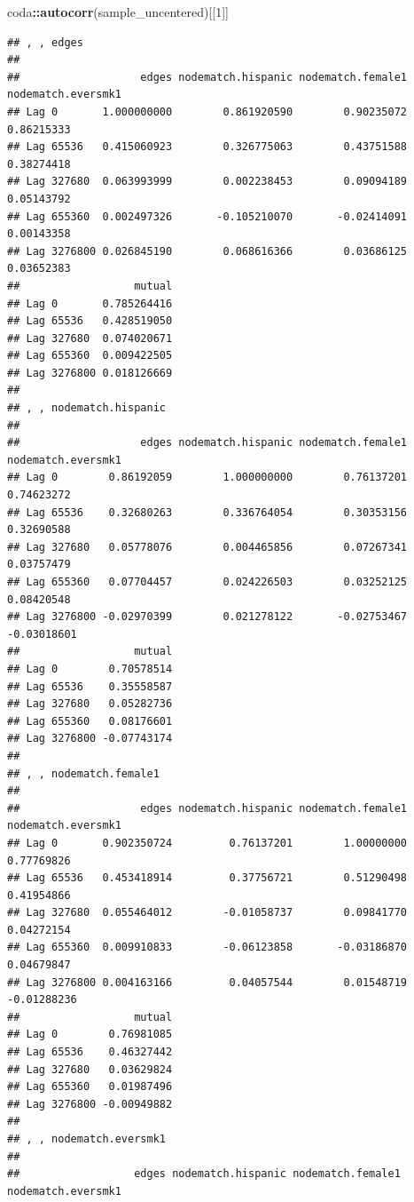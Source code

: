 \documentclass[
]{book}
\newenvironment{Shaded}{\begin{snugshade}}{\end{snugshade}}
\newcommand{\DecValTok}[1]{\textcolor[rgb]{0.00,0.00,0.81}{#1}}
\newcommand{\FunctionTok}[1]{\textcolor[rgb]{0.13,0.29,0.53}{\textbf{#1}}}
\newcommand{\NormalTok}[1]{#1}
\newcommand{\SpecialCharTok}[1]{\textcolor[rgb]{0.81,0.36,0.00}{\textbf{#1}}}
\begin{document}
\begin{enumerate}
\begin{Shaded}
\begin{Highlighting}[]
\NormalTok{coda}\SpecialCharTok{::}\FunctionTok{autocorr}\NormalTok{(sample\_uncentered)[[}\DecValTok{1}\NormalTok{]]}
\end{Highlighting}
\end{Shaded}

\begin{verbatim}
## , , edges
## 
##                   edges nodematch.hispanic nodematch.female1 nodematch.eversmk1
## Lag 0       1.000000000        0.861920590        0.90235072         0.86215333
## Lag 65536   0.415060923        0.326775063        0.43751588         0.38274418
## Lag 327680  0.063993999        0.002238453        0.09094189         0.05143792
## Lag 655360  0.002497326       -0.105210070       -0.02414091         0.00143358
## Lag 3276800 0.026845190        0.068616366        0.03686125         0.03652383
##                  mutual
## Lag 0       0.785264416
## Lag 65536   0.428519050
## Lag 327680  0.074020671
## Lag 655360  0.009422505
## Lag 3276800 0.018126669
## 
## , , nodematch.hispanic
## 
##                   edges nodematch.hispanic nodematch.female1 nodematch.eversmk1
## Lag 0        0.86192059        1.000000000        0.76137201         0.74623272
## Lag 65536    0.32680263        0.336764054        0.30353156         0.32690588
## Lag 327680   0.05778076        0.004465856        0.07267341         0.03757479
## Lag 655360   0.07704457        0.024226503        0.03252125         0.08420548
## Lag 3276800 -0.02970399        0.021278122       -0.02753467        -0.03018601
##                  mutual
## Lag 0        0.70578514
## Lag 65536    0.35558587
## Lag 327680   0.05282736
## Lag 655360   0.08176601
## Lag 3276800 -0.07743174
## 
## , , nodematch.female1
## 
##                   edges nodematch.hispanic nodematch.female1 nodematch.eversmk1
## Lag 0       0.902350724         0.76137201        1.00000000         0.77769826
## Lag 65536   0.453418914         0.37756721        0.51290498         0.41954866
## Lag 327680  0.055464012        -0.01058737        0.09841770         0.04272154
## Lag 655360  0.009910833        -0.06123858       -0.03186870         0.04679847
## Lag 3276800 0.004163166         0.04057544        0.01548719        -0.01288236
##                  mutual
## Lag 0        0.76981085
## Lag 65536    0.46327442
## Lag 327680   0.03629824
## Lag 655360   0.01987496
## Lag 3276800 -0.00949882
## 
## , , nodematch.eversmk1
## 
##                  edges nodematch.hispanic nodematch.female1 nodematch.eversmk1

\end{verbatim}
\end{enumerate}
\end{document}

